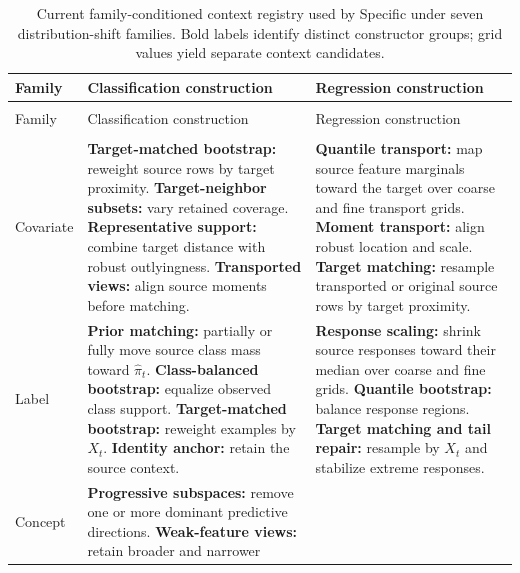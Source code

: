 \begingroup
  \footnotesize
  \setlength{\LTpre}{0.45\baselineskip}
  \setlength{\LTpost}{0.45\baselineskip}
  \begin{longtable}{@{}>{\raggedright\arraybackslash}p{} >{\raggedright\arraybackslash}p{} >{\raggedright\arraybackslash}p{}@{}}
    \caption{Current family-conditioned context registry used by Specific under
    seven distribution-shift families. Bold labels identify distinct constructor
    groups; grid values yield separate context candidates.}
    \label{tab:specific-shift-contexts} \\
    \toprule
    Family & Classification construction & Regression construction \\
    \midrule
    \endfirsthead
    \multicolumn{3}{@{}l}{\tablename~\thetable\ (continued)} \\
    \toprule
    Family & Classification construction & Regression construction \\
    \midrule
    \endhead
    \midrule
    \multicolumn{3}{r@{}}{Continued on next page} \\
    \endfoot
    \bottomrule
    \endlastfoot
    Covariate
      & \textbf{Target-matched bootstrap:} reweight source rows by target
        proximity. \textbf{Target-neighbor subsets:} vary retained coverage.
        \textbf{Representative support:} combine target distance with robust
        outlyingness. \textbf{Transported views:} align source moments before
        matching.
      & \textbf{Quantile transport:} map source feature marginals toward the
        target over coarse and fine transport grids. \textbf{Moment transport:}
        align robust location and scale. \textbf{Target matching:} resample
        transported or original source rows by target proximity. \\
    Label
      & \textbf{Prior matching:} partially or fully move source class mass
        toward $\hat\pi_t$. \textbf{Class-balanced bootstrap:} equalize observed
        class support. \textbf{Target-matched bootstrap:} reweight examples by
        $X_t$. \textbf{Identity anchor:} retain the source context.
      & \textbf{Response scaling:} shrink source responses toward their median
        over coarse and fine grids. \textbf{Quantile bootstrap:} balance
        response regions. \textbf{Target matching and tail repair:} resample by
        $X_t$ and stabilize extreme responses. \\
    Concept
      & \textbf{Progressive subspaces:} remove one or more dominant predictive
        directions. \textbf{Weak-feature views:} retain broader and narrower

\end{longtable}
